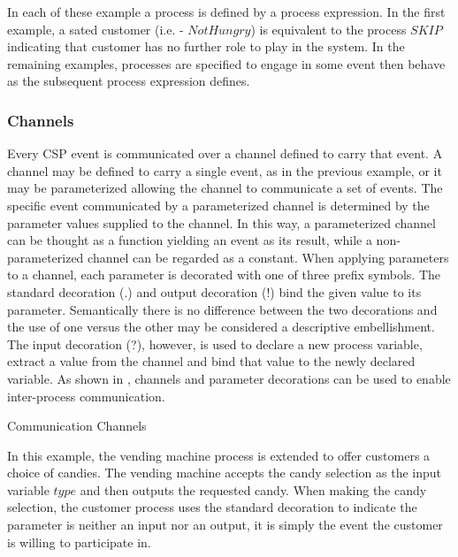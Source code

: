 \documentclass[letterpaper,10pt,draft]{book}
\begin{document}
In each of these example a process is defined by a process expression.  In the first
example, a sated customer (i.e. - $NotHungry$) is equivalent to the process $SKIP$
indicating that customer has no further role to play in the system.  In the remaining
examples, processes are specified to engage in some event then behave as the subsequent
process expression defines.

\subsubsection{Channels}
   \label{sect:ProcChannel}

Every CSP event is communicated over a channel defined to carry that event.  A channel
may be defined to carry a single event, as in the previous example, or it may be
parameterized allowing the channel to communicate a set of events.  The specific
event communicated by a parameterized channel is determined by the parameter values
supplied to the channel.  In this way, a parameterized channel can be thought as
a function yielding an event as its result, while a non-parameterized channel can
be regarded as a constant.  When applying parameters to a channel, each parameter
is decorated with one of three prefix symbols.  The standard decoration (.) and
output decoration (!) bind the given value to its parameter.  Semantically there
is no difference between the two decorations and the use of one versus the other
may be considered a descriptive embellishment.  The input decoration (?), however,
is used to declare a new process variable, extract a value from the channel and
bind that value to the newly declared variable.  As shown in ,
channels and parameter decorations can be used to enable inter-process communication.

\begin{example}
\begin{minipage}[t]{0.49\linewidth}
   
\end{minipage}
\begin{minipage}[t]{0.49\linewidth}
   \azbox
   
\end{minipage}

   \caption{Communication Channels}
   \label{ex:ProcChan}
\end{example}

In this example, the vending machine process is extended to offer customers a choice
of candies.  The vending machine accepts the candy selection as the input variable
$type$ and then outputs the requested candy.  When making the candy selection, the
customer process uses the standard decoration to indicate the parameter is neither
an input nor an output, it is simply the event the customer is willing to participate
in.
\end{document}
